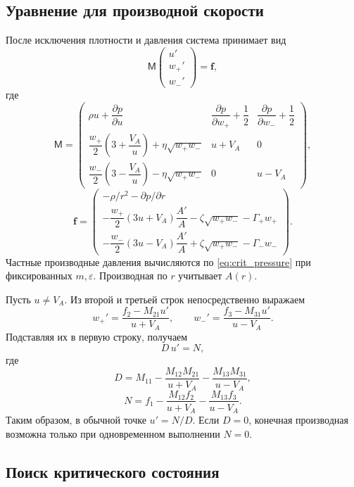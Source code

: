 \documentclass[12pt,a4paper]{article}
\begin{document}
\subsection{Уравнение для производной скорости}

После исключения плотности и давления система
принимает вид
\begin{equation}
\mathsf M
\begin{pmatrix}u'\\w_+'\\w_-'\end{pmatrix}
=\boldsymbol f,
\label{eq:crit_matrix}
\end{equation}
где
\[
\mathsf M=
\begin{pmatrix}
\rho u+\dfrac{\partial p}{\partial u}
&
\dfrac{\partial p}{\partial w_+}+\dfrac12
&
\dfrac{\partial p}{\partial w_-}+\dfrac12\\[8pt]
\dfrac{w_+}{2}\left(3+\dfrac{V_A}{u}\right)
+\eta\sqrt{w_+w_-}
&u+V_A&0\\[8pt]
\dfrac{w_-}{2}\left(3-\dfrac{V_A}{u}\right)
-\eta\sqrt{w_+w_-}
&0&u-V_A
\end{pmatrix},
\]
\[
\boldsymbol f=
\begin{pmatrix}
-\rho/r^2-\partial p/\partial r\\[4pt]
-\dfrac{w_+}{2}(3u+V_A)\dfrac{A'}A
-\zeta\sqrt{w_+w_-}-\Gamma_+w_+\\[7pt]
-\dfrac{w_-}{2}(3u-V_A)\dfrac{A'}A
+\zeta\sqrt{w_+w_-}-\Gamma_-w_-
\end{pmatrix}.
\]
Частные производные давления вычисляются по
\eqref{eq:crit_pressure} при фиксированных
$m,\varepsilon$. Производная по $r$ учитывает $A(r)$.

Пусть $u\ne V_A$.
Из второй и третьей строк непосредственно выражаем
\begin{equation}
w_+'=\frac{f_2-M_{21}u'}{u+V_A},
\qquad
w_-'=\frac{f_3-M_{31}u'}{u-V_A}.
\label{eq:crit_wave_derivatives}
\end{equation}
Подставляя их в первую строку, получаем
\begin{equation}
D\,u'=N,
\label{eq:crit_scalar}
\end{equation}
где
\[
D=M_{11}
-\frac{M_{12}M_{21}}{u+V_A}
-\frac{M_{13}M_{31}}{u-V_A},
\]
\[
N=f_1
-\frac{M_{12}f_2}{u+V_A}
-\frac{M_{13}f_3}{u-V_A}.
\]
Таким образом, в обычной точке $u'=N/D$.
Если $D=0$, конечная производная возможна
только при одновременном выполнении $N=0$.

\subsection{Поиск критического состояния}
\end{document}
